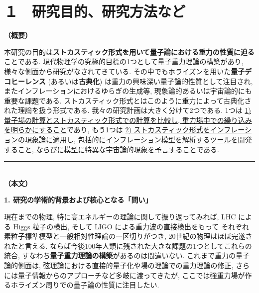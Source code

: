 \documentclass[11pt,a4j,dvipdfmx]{jarticle} 					%
\newcommand{\研究課題名}{\mgfamily\sffamily ストカスティック形式で迫る重力と量子論}
\newcommand{\研究機関名}{\mgfamily\sffamily 名古屋大学}
\newcommand{\研究代表者氏名}{\mgfamily\sffamily 多田祐一郎}
\newcommand{\研究期間の最終元号年度}{34}  %
\renewcommand{\emph}[1]{{\sffamily\gtfamily\bfseries #1}}
\begin{document}

\section{１　研究目的、研究方法など}

\noindent
\textbf{\mgfamily\sffamily（概要）}\\
	\mgfamily\sffamily
	
	本研究の目的は\emph{ストカスティック形式を用いて量子論における重力の性質に迫る}ことである. 
	現代物理学の究極的目標の1つとして量子重力理論の構築があり, 様々な側面から研究がなされてきている.
	その中でもホライズンを用いた\emph{量子デコヒーレンス} (あるいは\emph{古典化}) は重力の興味深い量子論的性質として注目され,
	またインフレーションにおけるゆらぎの生成等, 現象論的あるいは宇宙論的にも重要な課題である.
	ストカスティック形式とはこのように重力によって古典化された理論を扱う形式である.
	我々の研究計画は大きく分けて2つである. 1つは \ul{1) 量子場の計算とストカスティック形式での計算を比較し,
	重力場中での繰り込みを明らかにすること}であり, もう1つは \ul{2) ストカスティック形式をインフレーションの現象論に適用し,
	包括的にインフレーション模型を解析するツールを開発すること, ならびに模型に特異な宇宙論的現象を予言すること}である.
	
	\vspace*{13zw}	%

\noindent
\rule{\linewidth}{1pt}\\
\noindent
\textbf{（本文）}

\begin{mdframed}[roundcorner=0.5zw,
	innertopmargin=0.8zw,innerbottommargin=0.8zw,
	linecolor=black!50,linewidth=0.2zw,
	backgroundcolor=black!10]
	{\bfseries\gtfamily\sffamily\large 1. 研究の学術的背景および核心となる「問い」}
\end{mdframed}

現在までの物理, 特に高エネルギーの理論に関して振り返ってみれば, LHC による Higgs 粒子の検出, そして LIGO による重力波の直接検出をもって
それぞれ素粒子標準模型と一般相対性理論の一区切りがつき, 20世紀の物理はほぼ完遂されたと言える. 
ならば今後100年人類に残された大きな課題の1つとしてこれらの統合, すなわち\emph{量子重力理論の構築}があるのは間違いない.
これまで重力の量子論的側面は, 弦理論における直接的量子化や場の理論での重力理論の修正, さらには量子情報からのアプローチなど多岐に渡ってきたが,
ここでは強重力場が作るホライズン周りでの量子論の性質に注目したい.
\end{document}
